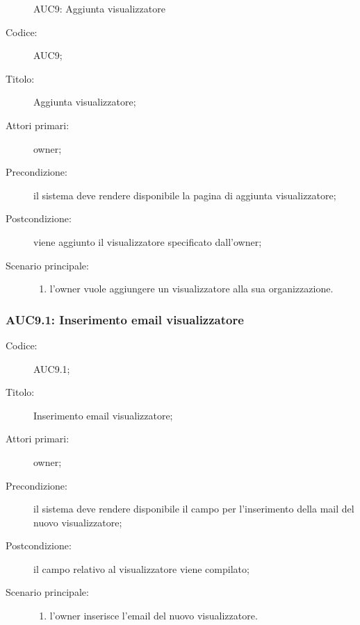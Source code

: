 \documentclass[../../../analisi-dei-requisiti.tex]{subfiles}
\begin{document}
\begin{figure}[H]
  \centering
  \caption{AUC9: Aggiunta visualizzatore}%
  \label{fig:AUC9}
\end{figure}

\begin{description}
  \item[Codice:] AUC9;
  \item[Titolo:] Aggiunta visualizzatore;
  \item[Attori primari:] owner;
  \item[Precondizione:] il sistema deve rendere disponibile la pagina di aggiunta visualizzatore;
  \item[Postcondizione:] viene aggiunto il visualizzatore specificato dall'owner;
  \item[Scenario principale:]
  \begin{enumerate}
    \item l'owner vuole aggiungere un visualizzatore alla sua organizzazione.
  \end{enumerate}
\end{description}

\subsubsection{AUC9.1: Inserimento email visualizzatore}%
\label{subs:AUC9.1}
\begin{description}
  \item[Codice:] AUC9.1;
  \item[Titolo:] Inserimento email visualizzatore;
  \item[Attori primari:] owner;
  \item[Precondizione:] il sistema deve rendere disponibile il campo per l'inserimento della mail del nuovo visualizzatore;
  \item[Postcondizione:] il campo relativo al visualizzatore viene compilato;
  \item[Scenario principale:]
  \begin{enumerate}
    \item l'owner inserisce l'email del nuovo visualizzatore.
  \end{enumerate}
\end{description}
\end{document}

